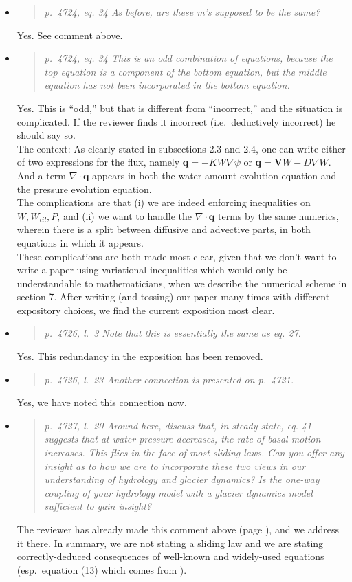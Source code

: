 \documentclass[11pt,reqno]{amsart}
\newcommand{\grad}{\nabla}
\newcommand{\reply}[2]{
\medskip\medskip
\item  \begin{quote}
\emph{#1}
\end{quote}

\medskip
\noindent #2}
\begin{document}
\begin{itemize}
\reply{p.~4724, eq. 34 As before, are these m's supposed to be the same?}
{Yes.  See comment above.}

\reply{p.~4724, eq. 34 This is an odd combination of equations, because the top equation is a component of the bottom equation, but the middle equation has not been incorporated in the bottom equation.}
{Yes.  This is ``odd,'' but that is different from ``incorrect,'' and the situation is complicated.  If the reviewer finds it incorrect (i.e.~deductively incorrect) he should say so.\\
\indent The context: As clearly stated in subsections 2.3 and 2.4, one can write either of two expressions for the flux, namely $\mathbf{q} = -K W \grad \psi$ or $\mathbf{q} = \mathbf{V} W - D \grad W$.  And a term $\nabla\cdot\mathbf{q}$ appears in both the water amount evolution equation and the pressure evolution equation.  \\
\indent The complications are that (i) we are indeed enforcing inequalities on $W,W_{til},P$, and (ii) we want to handle the $\nabla\cdot\mathbf{q}$ terms by the same numerics, wherein there is a split between diffusive and advective parts, in both equations in which it appears.\\
\indent  These complications are both made most clear, given that we don't want to write a paper using variational inequalities which would only be understandable to mathematicians, when we describe the numerical scheme in section 7.  After writing (and tossing) our paper many times with different expository choices, we find the current exposition most clear.}

\reply{p.~4726, l.~3 Note that this is essentially the same as eq. 27.}
{Yes.  This redundancy in the exposition has been removed.}

\reply{p.~4726, l.~23 Another connection is presented on p.~4721.}
{Yes, we have noted this connection now.}

\reply{p.~4727, l.~20 Around here, discuss that, in steady state, eq. 41 suggests that at water pressure decreases, the rate of basal motion increases. This flies in the face of most sliding laws. Can you offer any insight as to how we are to incorporate these two views in our understanding of hydrology and glacier dynamics?  Is the one-way coupling of your hydrology model with a glacier dynamics model sufficient to gain insight?}
{The reviewer has already made this comment above (page \pageref{inversepage}), and we address it there.  In summary, we are not stating a sliding law and we are stating correctly-deduced consequences of well-known and widely-used equations (esp.~equation (13) which comes from \cite{Hewitt2011}).}


\end{itemize}
\end{document}
